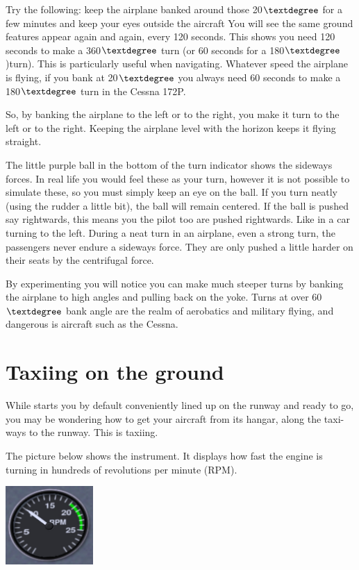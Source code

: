 Try the following: keep the airplane banked around those 20$\textdegree$ for a
few minutes and keep your eyes outside the aircraft You will see the same
ground features appear again and again, every 120 seconds. This shows you
need 120 seconds to make a 360$\textdegree$ turn (or 60 seconds for a
180$\textdegree$)turn). This is particularly useful when navigating.
Whatever speed the airplane is flying, if you bank at 20$\textdegree$ you
always need 60 seconds to make a 180$\textdegree$ turn in the Cessna 172P.

So, by banking the airplane to the left or to the right, you make it turn to
the left or to the right. Keeping the airplane level with the horizon keeps
it flying straight.

The little purple ball in the bottom of the turn indicator
shows the sideways forces. In real life you would feel these as your turn,
however it is not possible to simulate these, so you must simply keep an eye
on the ball. If you turn neatly (using the rudder a little bit),
the ball will remain centered. If the ball is pushed say rightwards, this
means you the pilot too are pushed rightwards. Like in a car turning to the
left. During a neat turn in an airplane, even a strong turn, the passengers
never endure a sideways force. They are only pushed a little harder on their
seats by the centrifugal force.

By experimenting you will notice you can make much steeper turns by
banking the airplane to high angles and pulling back on the yoke. Turns at over
60$\textdegree$ bank angle are the realm of aerobatics and military flying, and
dangerous is aircraft such as the Cessna.

\section{Taxiing on the ground}
\label{sec:TaxiTurning}

While \FlightGear{} starts you by default conveniently lined up on the
runway and ready to go, you may be wondering how to get your aircraft from
its hangar, along the taxi-ways to the runway. This is taxiing.

The picture below shows the  instrument. It displays how fast
the engine is turning in hundreds of revolutions per minute (RPM).

\begin{center}
\includegraphics[width=0.25\textwidth]{img/tut_20}
\end{center}

